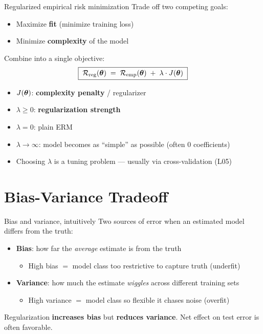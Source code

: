 \documentclass[aspectratio=169]{beamer}
\begin{document}
\begin{frame}{Regularized empirical risk minimization}
  Trade off two competing goals:
  \begin{itemize}
    \item Maximize \textbf{fit} (minimize training loss)
    \item Minimize \textbf{complexity} of the model
  \end{itemize}
  \vfill
  Combine into a single objective:
  \[
    \boxed{\;\mathcal{R}_{\text{reg}}(\bm{\theta}) \;=\; \mathcal{R}_{\text{emp}}(\bm{\theta}) \;+\; \lambda \cdot J(\bm{\theta})\;}
  \]
  \begin{itemize}\small
    \item $J(\bm{\theta})$: \textbf{complexity penalty} / regularizer
    \item $\lambda \ge 0$: \textbf{regularization strength}
    \item $\lambda = 0$: plain ERM
    \item $\lambda \to \infty$: model becomes as ``simple'' as possible (often 0 coefficients)
    \item Choosing $\lambda$ is a tuning problem — usually via cross-validation (L05)
  \end{itemize}
\end{frame}

\section{Bias-Variance Tradeoff}

\begin{frame}{Bias and variance, intuitively}
  Two sources of error when an estimated model differs from the truth:
  \vfill
  \begin{itemize}
    \item \textbf{Bias}: how far the \emph{average} estimate is from the truth
      \begin{itemize}
        \item High bias $=$ model class too restrictive to capture truth (underfit)
      \end{itemize}
    \item \textbf{Variance}: how much the estimate \emph{wiggles} across different training sets
      \begin{itemize}
        \item High variance $=$ model class so flexible it chases noise (overfit)
      \end{itemize}
  \end{itemize}
  \vfill
  Regularization \textbf{increases bias} but \textbf{reduces variance}. Net effect on test error is often favorable.
\end{frame}
\end{document}
